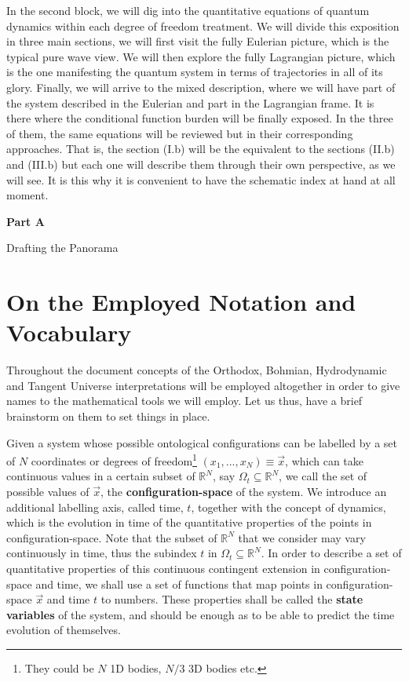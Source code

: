 \documentclass[11pt, a4paper]{article} %
\newcommand{\R}{\mathbb{R}} %
\newenvironment{kapituloBerria}[1][]
  {\clearpage           %
   \thispagestyle{empty}%
   \vspace*{\stretch{2}}%
   \raggedleft          %
   {\textbf{{\fontsize{60}{40}\selectfont \hspace{+9.5cm}#1\newline \newline}}}
   \bf
   \fontsize{30}{20}\selectfont
  }
  {\par %
   \vspace{\stretch{3}} %
   \clearpage           %
  }
\begin{document}
In the second block, we will dig into the quantitative equations of quantum dynamics within each degree of freedom treatment. We will divide this exposition in three main sections, we will first visit the fully Eulerian picture, which is the typical pure wave view. We will then explore the fully Lagrangian picture, which is the one manifesting the quantum system in terms of trajectories in all of its glory. Finally, we will arrive to the mixed description, where we will have part of the system described in the Eulerian and part in the Lagrangian frame. It is there where the conditional function burden will be finally exposed. In the three of them, the same equations will be reviewed but in their corresponding approaches. That is, the section (I.b) will be the equivalent to the sections (II.b) and (III.b) but each one will describe them through their own perspective, as we will see. It is this why it is convenient to have the schematic index at hand at all moment.

\newpage

\begin{kapituloBerria}[Part A]
Drafting the Panorama
\end{kapituloBerria}

\pagestyle{fancy}

\section*{On the Employed Notation and Vocabulary}

Throughout the document concepts of the Orthodox, Bohmian, Hydrodynamic and Tangent Universe interpretations will be employed altogether in order to give names to the mathematical tools we will employ. Let us thus, have a brief brainstorm on them to set things in place.

Given a system whose possible ontological configurations can be labelled by a set of $N$ coordinates or degrees of freedom\footnote{They could be $N$ 1D bodies, $N/3$ 3D bodies etc.} $(x_1, ...,x_N)\equiv \vec{x}$, which can take continuous values in a certain subset of $\R^N$, say $\Omega_t\subseteq \R^N$, we call the set of possible values of $\vec{x}$, the {\bf configuration-space} of the system. We introduce an additional labelling axis, called time, $t$, together with the concept of dynamics, which is the evolution in time of the quantitative properties of the points in configuration-space. Note that the subset of $\R^N$ that we consider may vary continuously in time, thus the subindex $t$ in $\Omega_t\subseteq \R^N$. In order to describe a set of quantitative properties of this continuous contingent extension in configuration-space and time, we shall use a set of functions that map points in configuration-space $\vec{x}$ and time $t$ to numbers. These properties shall be called the {\bf state variables} of the system, and should be enough as to be able to predict the time evolution of themselves. 
\end{document}
